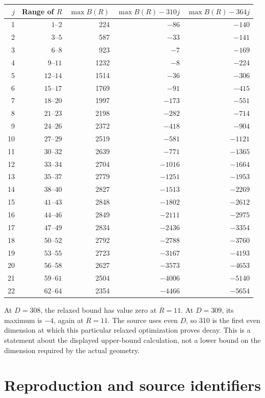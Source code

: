 \documentclass[11pt]{article}
\theoremstyle{definition}
\theoremstyle{remark}
\newcommand{\1}{\mathbf 1}
\begin{document}
\begin{center}
\small
\begin{tabular}{@{}rrrrr@{}}
\toprule
$j$ & Range of $R$ & $\max B(R)$ & $\max B(R)-310j$ & $\max B(R)-364j$\\
\midrule
1 & $1$--$2$ &224&$-86$&$-140$\\
2 & $3$--$5$ &587&$-33$&$-141$\\
3 & $6$--$8$ &923&$-7$&$-169$\\
4 & $9$--$11$ &1232&$-8$&$-224$\\
5 & $12$--$14$ &1514&$-36$&$-306$\\
6 & $15$--$17$ &1769&$-91$&$-415$\\
7 & $18$--$20$ &1997&$-173$&$-551$\\
8 & $21$--$23$ &2198&$-282$&$-714$\\
9 & $24$--$26$ &2372&$-418$&$-904$\\
10 & $27$--$29$ &2519&$-581$&$-1121$\\
11 & $30$--$32$ &2639&$-771$&$-1365$\\
12 & $33$--$34$ &2704&$-1016$&$-1664$\\
13 & $35$--$37$ &2779&$-1251$&$-1953$\\
14 & $38$--$40$ &2827&$-1513$&$-2269$\\
15 & $41$--$43$ &2848&$-1802$&$-2612$\\
16 & $44$--$46$ &2849&$-2111$&$-2975$\\
17 & $47$--$49$ &2834&$-2436$&$-3354$\\
18 & $50$--$52$ &2792&$-2788$&$-3760$\\
19 & $53$--$55$ &2723&$-3167$&$-4193$\\
20 & $56$--$58$ &2627&$-3573$&$-4653$\\
21 & $59$--$61$ &2504&$-4006$&$-5140$\\
22 & $62$--$64$ &2354&$-4466$&$-5654$\\
\bottomrule
\end{tabular}
\end{center}

At $D=308$, the relaxed bound has value zero at $R=11$. At $D=309$, its maximum
is $-4$, again at $R=11$. The source uses even $D$, so 310 is the first even
dimension at which this particular relaxed optimization proves decay.
This is a statement about the displayed upper-bound calculation, not a lower
bound on the dimension required by the actual geometry.

\section{Reproduction and source identifiers}
\label{app:reproduce}
\end{document}
